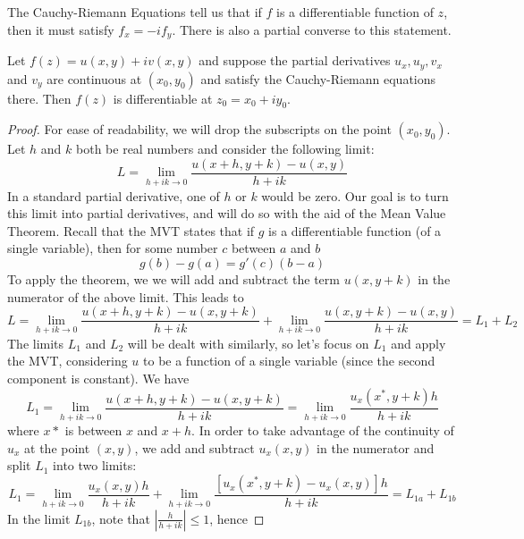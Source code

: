 \documentclass[handout]{ximera}
\begin{document}
The Cauchy-Riemann Equations tell us that if $f$ is a differentiable function of $z$, then it must satisfy $f_x = -if_y$.
There is also a partial converse to this statement.  

\begin{theorem}
Let $f(z) = u(x,y) + iv(x,y)$ and suppose the partial derivatives $u_x, u_y, v_x$ and $v_y$ are continuous at $(x_0,y_0)$ and 
 satisfy the Cauchy-Riemann equations there. Then $f(z)$
is differentiable at $z_0 = x_0 + iy_0$.
\end{theorem}

\begin{proof}
For ease of readability, we will drop the subscripts on the point $(x_0,y_0)$.\\
Let $h$ and $k$ both be real numbers and consider the following limit:
\[
L = \lim_{h+ik \to 0} \frac{u(x+h, y+k) - u(x,y)}{h+ik} 
\]
In a standard partial derivative, one of $h$ or $k$ would be zero. Our goal is to turn this limit into partial derivatives,
and will do so with the aid of the Mean Value Theorem. Recall that the MVT states that 
if $g$ is a differentiable function (of a single variable), then for some number $c$ between $a$ and $b$
\[
g(b) -g(a) = g'(c)(b-a)
\]
To apply the theorem, we   
we will add and subtract the term $u(x,y+k)$ in the numerator of the above limit.
This leads to 
\[
L = \lim_{h+ik \to 0} \frac{u(x+h, y+k) - u(x,y+k)}{h+ik} + \lim_{h+ik \to 0} \frac{u(x, y+k) - u(x,y)}{h+ik} =  L_1 + L_2 
\]
The limits $L_1$ and $L_2$ will be dealt with similarly, so let's focus on $L_1$ and apply the MVT, 
considering $u$ to be a function of a single variable (since the second component is constant). We have
\[
L_1 = \lim_{h+ik \to 0} \frac{u(x+h, y+k) - u(x,y+k)}{h+ik} = \lim_{h+ik \to 0} \frac{u_x(x^*,y+k)h}{h+ik}
\]
where $x*$ is between $x$ and $x+h$. In order to take advantage of the continuity of $u_x$  at the point $(x,y)$, 
we add and subtract $u_x(x,y)$ in the numerator and split $L_1$ into two limits:
\[
L_1 = \lim_{h+ik \to 0} \frac{u_x(x,y)h}{h+ik} + \lim_{h+ik \to 0} \frac{[u_x(x^*,y+k)-u_x(x,y)]h}{h+ik}= L_{1a} + L_{1b}
\]
In the limit $L_{1b}$, note that $\left|\frac{h}{h+ik}\right| \leq 1$, hence
 

\end{proof}
\end{document}
